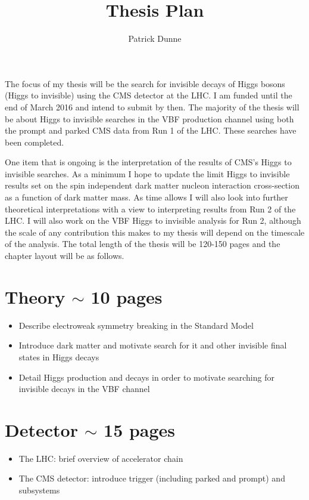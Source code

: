 \documentclass[12pt]{article}
\begin{document}
\title{Thesis Plan}
\author{Patrick Dunne}

\maketitle
The focus of my thesis will be the search for invisible decays of Higgs bosons (Higgs to invisible) using the CMS detector at the LHC. I am funded until the end of March 2016 and intend to submit by then. The majority of the thesis will be about Higgs to invisible searches in the VBF production channel using both the prompt and parked CMS data from Run 1 of the LHC. These searches have been completed.

One item that is ongoing is the interpretation of the results of CMS's Higgs to invisible searches. As a minimum I hope to update the limit Higgs to invisible results set on the spin independent dark matter nucleon interaction cross-section as a function of dark matter mass. As time allows I will also look into further theoretical interpretations with a view to interpreting results from Run 2 of the LHC. I will also work on the VBF Higgs to invisible analysis for Run 2, although the scale of any contribution this makes to my thesis will depend on the timescale of the analysis. The total length of the thesis will be 120-150 pages and the chapter layout will be as follows.

\section{Theory $\sim$ 10 pages}
\begin{itemize}
\label{sec:theory}
\item Describe electroweak symmetry breaking in the Standard Model
\item Introduce dark matter and motivate search for it and other invisible final states in Higgs decays
\item Detail Higgs production and decays in order to motivate searching for invisible decays in the VBF channel
\end{itemize}

\section{Detector $\sim$ 15 pages}
\begin{itemize}
\label{sec:detector}
\item The LHC: brief overview of accelerator chain
\item The CMS detector: introduce trigger (including parked and prompt) and subsystems
\end{itemize}
\end{document}
